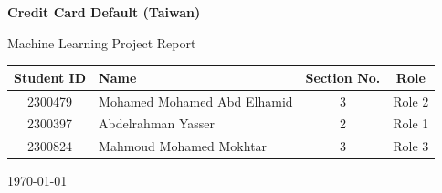 \begin{titlepage}
	\centering

	\vspace*{2cm}
	{\LARGE \textbf{Credit Card Default (Taiwan)}\par}

	\vspace{1.5cm}
	{\Large Machine Learning Project Report\par}

	\vspace{2cm}
	\renewcommand{\arraystretch}{1.4}
	\begin{tabular}{|c|l|c|c|}
		\hline
		\textbf{Student ID} & \textbf{Name} & \textbf{Section No.} & \textbf{Role} \\
		\hline
		2300479 & Mohamed Mohamed Abd Elhamid & 3 & Role 2 \\
		\hline
		2300397 & Abdelrahman Yasser & 2 & Role 1 \\
		\hline
		2300824 & Mahmoud Mohamed Mokhtar & 3 & Role 3 \\
		\hline
	\end{tabular}

	\vfill
	{\large \today\par}
\end{titlepage}
